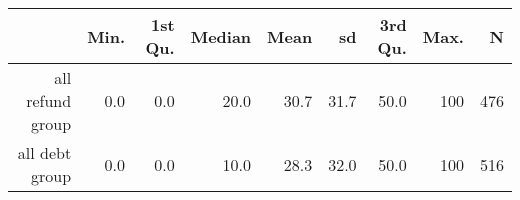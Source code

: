 \begin{table}[ht]
\centering
\begin{tabular}{rrrrrrrrr}
  \hline
 & Min. & 1st Qu. & Median & Mean & sd & 3rd Qu. & Max. & N \\ 
  \hline
all refund group & 0.0 & 0.0 & 20.0 & 30.7 & 31.7 & 50.0 & 100 & 476 \\ 
  all debt group & 0.0 & 0.0 & 10.0 & 28.3 & 32.0 & 50.0 & 100 & 516 \\ 
   \hline
\end{tabular}
\end{table}
